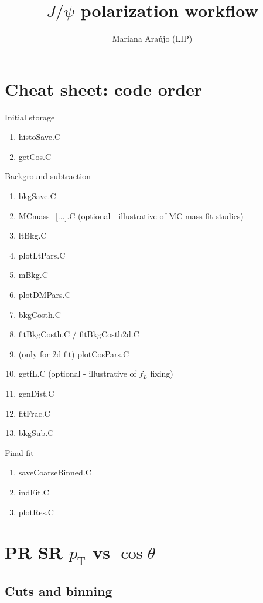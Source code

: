 \documentclass{article}
\newcommand{\pt}{p_\text{T}}
\newcommand{\cost}{\cos\theta}
\begin{document}
\title{$J/\psi$ polarization workflow }
\author{Mariana Ara\'ujo (LIP)}
\maketitle

\tableofcontents

\pagebreak

\section{Cheat sheet: code order}


Initial storage
\begin{enumerate}
\item histoSave.C
\item getCos.C
\end{enumerate}

Background subtraction
\begin{enumerate}
\item bkgSave.C
\item MCmass\_[...].C (optional - illustrative of MC mass fit studies)
\item ltBkg.C
\item plotLtPars.C
\item mBkg.C
\item plotDMPars.C
\item bkgCosth.C
\item fitBkgCosth.C / fitBkgCosth2d.C
\item (only for 2d fit) plotCosPars.C
\item getfL.C (optional - illustrative of $f_L$ fixing)
\item genDist.C
\item fitFrac.C
\item bkgSub.C
\end{enumerate}

Final fit
\begin{enumerate}
\item saveCoarseBinned.C
\item indFit.C
\item plotRes.C
\end{enumerate}

\pagebreak

\section{PR SR $\pt$ vs $\cost$}
\subsection{Cuts and binning} 
\end{document}
